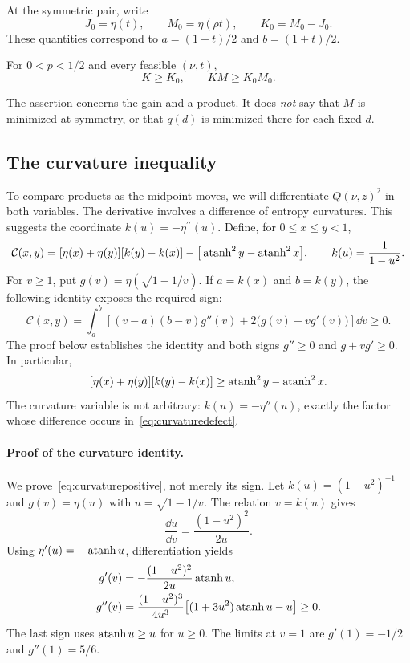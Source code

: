 At the symmetric pair, write
\begin{equation}\label{eq:centered}
J_0=\eta(t),\qquad M_0=\eta(\rho t),\qquad K_0=M_0-J_0.
\end{equation}
These quantities correspond to $a=(1-t)/2$ and $b=(1+t)/2$.

\begin{lemma}\label{lem:product}
For $0<p<1/2$ and every feasible $(\nu,t)$,
\begin{equation}\label{eq:product}
K\ge K_0,\qquad KM\ge K_0M_0.
\end{equation}
\end{lemma}
The assertion concerns the gain and a product. It does \emph{not} say that $M$ is minimized at symmetry, or that $q(d)$ is minimized there for each fixed $d$.

\subsection{The curvature inequality}
To compare products as the midpoint moves, we will differentiate $Q(\nu,z)^2$ in both variables. The derivative involves a difference of entropy curvatures. This suggests the coordinate $k(u)=-\eta^{\prime\prime}(u)$. Define, for $0\le x\le y<1$,
\begin{equation}\label{eq:curvaturedefect}
\mathcal C(x,y)=[\eta(x)+\eta(y)][k(y)-k(x)]
-\big[\operatorname{atanh}^2 y-\operatorname{atanh}^2 x\big],\qquad k(u)=\frac1{1-u^2}.
\end{equation}
For $v\ge1$, put $g(v)=\eta(\sqrt{1-1/v})$. If $a=k(x)$ and $b=k(y)$, the following identity exposes the required sign:
\begin{equation}\label{eq:curvaturepositive}
\mathcal C(x,y)=\int_a^b\left[(v-a)(b-v)g''(v)+2\big(g(v)+vg'(v)\big)\right]\dd v\ge0.
\end{equation}
The proof below establishes the identity and both signs $g''\ge0$ and $g+vg'\ge0$. In particular,
\begin{equation}\label{eq:curvature}
[\eta(x)+\eta(y)][k(y)-k(x)]\ge\operatorname{atanh}^2 y-\operatorname{atanh}^2 x.
\end{equation}
The curvature variable is not arbitrary: $k(u)=-\eta''(u)$, exactly the factor whose difference occurs in~\eqref{eq:curvaturedefect}.

\paragraph{Proof of the curvature identity.}\label{app:curvature}
We prove~\eqref{eq:curvaturepositive}, not merely its sign. Let $k(u)=(1-u^2)^{-1}$ and $g(v)=\eta(u)$ with $u=\sqrt{1-1/v}$. The relation $v=k(u)$ gives
\[
\frac{\dd u}{\dd v}=\frac{(1-u^2)^2}{2u}.
\]
Using $\eta'(u)=-\operatorname{atanh} u$, differentiation yields
\begin{align}\label{eq:curvaturederivatives}
g'(v)&=-\frac{(1-u^2)^2}{2u}\operatorname{atanh} u,\\
g''(v)&=\frac{(1-u^2)^3}{4u^3}\big[(1+3u^2)\operatorname{atanh} u-u\big]\ge0.\notag
\end{align}
The last sign uses $\operatorname{atanh} u\ge u$ for $u\ge0$. The limits at $v=1$ are $g'(1)=-1/2$ and $g''(1)=5/6$.

